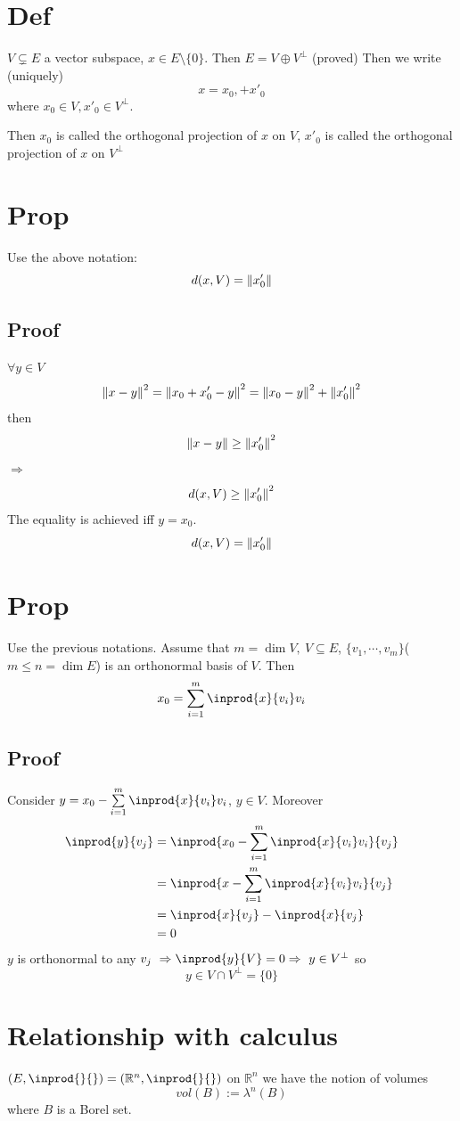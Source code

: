 \documentclass{book}
\begin{document}
\section{Def}
$V\subsetneq E$ a vector subspace, $x\in E\setminus\{0\}$. Then $E=V\oplus V^\perp$ (proved) Then we write (uniquely)
$$x=x_0,+x'_0$$ where $x_0\in V, x'_0\in V^\perp$.

Then $x_0$ is called the orthogonal projection of $x$ on $V$, $x'_0$ is called the orthogonal projection of $x$ on $V^\perp$
\section{Prop}
Use the above notation:
$$d(x,V)=\left\lVert x'_0 \right\rVert$$
\subsection*{Proof}
$\forall y\in V$$$\left\lVert x-y \right\rVert^2=\left\lVert x_0+x'_0-y \right\rVert^2=\left\lVert x_0-y \right\rVert^2+\left\lVert x'_0 \right\rVert^2$$
then$$\left\lVert x-y \right\rVert\geq\left\lVert x'_0 \right\rVert^2$$
$\Rightarrow$
$$d(x,V)\geq\left\lVert x'_0 \right\rVert^2$$
The equality is achieved iff $y=x_0$.
$$d(x,V)=\left\lVert x'_0 \right\rVert$$
\section{Prop}
Use the previous notations. Assume that $m=\dim V,\ V\subseteq E$, $\{v_1,\cdots,v_m\}$($m\leq n=\dim E$) is an orthonormal basis of $V$. Then
$$x_0=\sum\limits_{i=1}^m\inprod{x}{v_i}v_i$$
\subsection*{Proof}
Consider $y=x_0-\sum\limits_{i=1}^m\inprod{x}{v_i}v_i$, $y\in V$. Moreover$$
\begin{aligned}
    \inprod{y}{v_j}&=\inprod{x_0-\sum\limits_{i=1}^m\inprod{x}{v_i}v_i}{v_j}\\
    &=\inprod{x-\sum\limits_{i=1}^m\inprod{x}{v_i}v_i}{v_j}\\
    &=\inprod{x}{v_j}-\inprod{x}{v_j}\\
    &=0
\end{aligned}$$
$y$ is orthonormal to any $v_j\ \Rightarrow\inprod{y}{V}=0\Rightarrow \ y\in V^\perp$ so
$$y\in V\cap V^\perp=\{0\}$$
\section{Relationship with calculus}
$(E,\inprod{}{})=(\mathbb{R}^n,\inprod{}{})$ on $\mathbb{R}^n$ we have the notion of volumes$$vol(B):=\lambda^n(B)$$
where $B$ is a Borel set.
\end{document}
